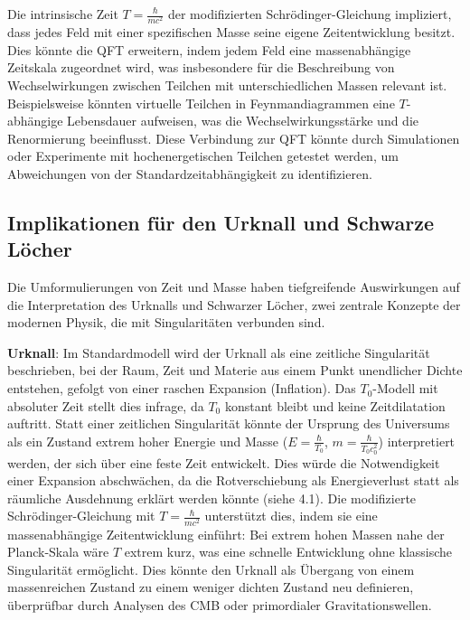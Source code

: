 \documentclass[a4paper,12pt]{article}
\begin{document}
	Die intrinsische Zeit \( T = \frac{\hbar}{m c^2} \) der modifizierten Schrödinger-Gleichung impliziert, dass jedes Feld mit einer spezifischen Masse seine eigene Zeitentwicklung besitzt. Dies könnte die QFT erweitern, indem jedem Feld eine massenabhängige Zeitskala zugeordnet wird, was insbesondere für die Beschreibung von Wechselwirkungen zwischen Teilchen mit unterschiedlichen Massen relevant ist. Beispielsweise könnten virtuelle Teilchen in Feynmandiagrammen eine \( T \)-abhängige Lebensdauer aufweisen, was die Wechselwirkungsstärke und die Renormierung beeinflusst. Diese Verbindung zur QFT könnte durch Simulationen oder Experimente mit hochenergetischen Teilchen getestet werden, um Abweichungen von der Standardzeitabhängigkeit zu identifizieren.
	
	\subsection{Implikationen für den Urknall und Schwarze Löcher}
	Die Umformulierungen von Zeit und Masse haben tiefgreifende Auswirkungen auf die Interpretation des Urknalls und Schwarzer Löcher, zwei zentrale Konzepte der modernen Physik, die mit Singularitäten verbunden sind.
	
	\textbf{Urknall}: Im Standardmodell wird der Urknall als eine zeitliche Singularität beschrieben, bei der Raum, Zeit und Materie aus einem Punkt unendlicher Dichte entstehen, gefolgt von einer raschen Expansion (Inflation). Das \( T_0 \)-Modell mit absoluter Zeit stellt dies infrage, da \( T_0 \) konstant bleibt und keine Zeitdilatation auftritt. Statt einer zeitlichen Singularität könnte der Ursprung des Universums als ein Zustand extrem hoher Energie und Masse (\( E = \frac{\hbar}{T_0} \), \( m = \frac{\hbar}{T_0 c_0^2} \)) interpretiert werden, der sich über eine feste Zeit entwickelt. Dies würde die Notwendigkeit einer Expansion abschwächen, da die Rotverschiebung als Energieverlust statt als räumliche Ausdehnung erklärt werden könnte (siehe 4.1). Die modifizierte Schrödinger-Gleichung mit \( T = \frac{\hbar}{m c^2} \) unterstützt dies, indem sie eine massenabhängige Zeitentwicklung einführt: Bei extrem hohen Massen nahe der Planck-Skala wäre \( T \) extrem kurz, was eine schnelle Entwicklung ohne klassische Singularität ermöglicht. Dies könnte den Urknall als Übergang von einem massenreichen Zustand zu einem weniger dichten Zustand neu definieren, überprüfbar durch Analysen des CMB oder primordialer Gravitationswellen.
	
\end{document}

